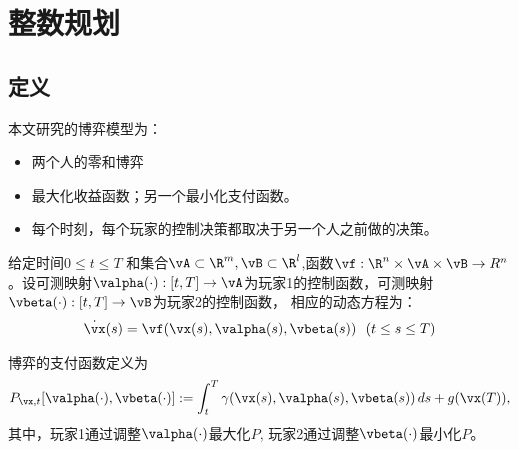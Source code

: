 \section{整数规划}

\subsection{定义}
\begin{frame}{\subsecname}
本文研究的博弈模型为：
    \begin{itemize}
        \item 两个人的零和博弈
        \item 最大化收益函数；另一个最小化支付函数。
        \item 每个时刻，每个玩家的控制决策都取决于另一个人之前做的决策。
    \end{itemize}
    \begin{definition}
    给定时间$0\le t \le T$ 和集合$\vA\subset\R^m, \vB\subset\R^l$,函数$\vf:\R^n\times \vA \times \vB \rightarrow R^n$。设可测映射$\valpha(\cdot): [t,T]\rightarrow \vA $为玩家1的控制函数，可测映射$\vbeta(\cdot): [t,T]\rightarrow \vB $为玩家2的控制函数，
    相应的动态方程为：
    \begin{align*}
        \Dot{\vx}(s)=\vf(\vx(s),\valpha(s),\vbeta(s))\ \ (t\le s \le T)
    \end{align*}
    \end{definition}
    
    \begin{definition}[支付（报酬）函数]
    博弈的支付函数定义为
    \begin{align}
        P_{\vx,t}[\valpha(\cdot),\vbeta(\cdot)]:=\int_t^T \gamma (\vx(s),\valpha (s),\vbeta(s)) \,ds +g(\vx(T)),
    \end{align}
    其中，玩家1通过调整$\valpha(\cdot)$最大化$P$, 玩家2通过调整$\vbeta(\cdot)$最小化$P$。
    \end{definition}

\end{frame}

